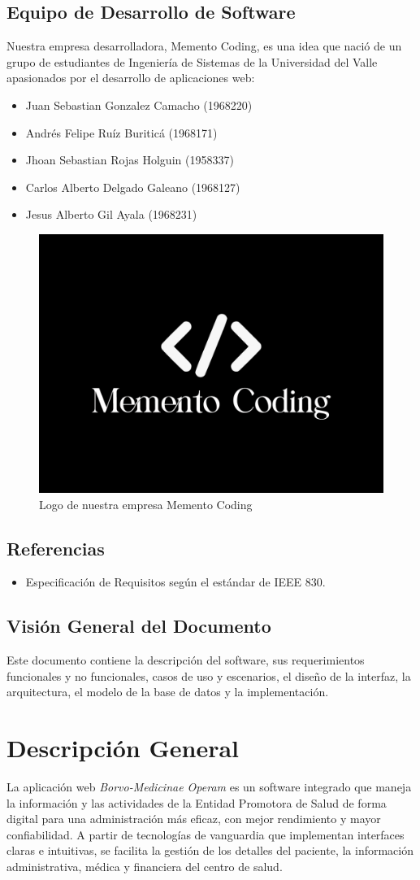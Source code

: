 \documentclass[12pt,a4paper]{article}
\begin{document}
\subsection{Equipo de Desarrollo de Software}
Nuestra empresa desarrolladora, Memento Coding, es una idea que nació de un grupo de estudiantes de Ingeniería de Sistemas de la Universidad del Valle apasionados por el desarrollo de aplicaciones web:

\begin{itemize}
\item Juan Sebastian Gonzalez Camacho (1968220)
\item Andrés Felipe Ruíz Buriticá (1968171)
\item Jhoan Sebastian Rojas Holguin (1958337)
\item Carlos Alberto Delgado Galeano (1968127)
\item Jesus Alberto Gil Ayala (1968231)
\end{itemize}
\begin{figure}[H]
\centering
{\includegraphics[width=0.5 \textwidth]{logo_memento} \par}
\caption{Logo de nuestra empresa Memento Coding}
\end{figure}
\subsection{Referencias}
\begin{itemize}
\item Especificación de Requisitos según el estándar de IEEE 830.
\end{itemize}
\subsection{Visión General del Documento}
Este documento contiene la descripción del software, sus requerimientos funcionales y no funcionales, casos de uso y escenarios, el diseño de la interfaz, la arquitectura, el modelo de la base de datos y la implementación.
\section{Descripción General}
La aplicación web \emph{Borvo-Medicinae Operam} es un software integrado que maneja la información y las actividades de la Entidad Promotora de Salud de forma digital para una administración más eficaz, con mejor rendimiento y mayor confiabilidad. A partir de tecnologías de vanguardia que implementan interfaces claras e intuitivas, se facilita la gestión de los detalles del paciente, la información administrativa, médica y financiera del centro de salud.
\end{document}

